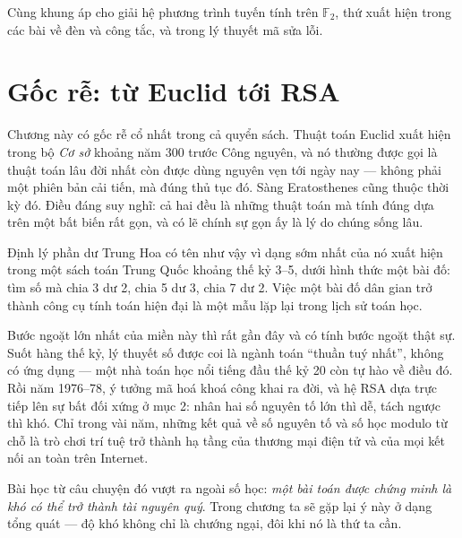 \documentclass[../../algorithm.tex]{subfiles}
\begin{document}
Cùng khung áp cho giải hệ phương trình tuyến tính trên \(\mathbb{F}_2\), thứ xuất hiện trong các bài về đèn và công tắc, và trong lý thuyết mã sửa lỗi.

\section{Gốc rễ: từ Euclid tới RSA}

Chương này có gốc rễ cổ nhất trong cả quyển sách. Thuật toán Euclid xuất hiện trong bộ \emph{Cơ sở} khoảng năm 300 trước Công nguyên, và nó thường được gọi là thuật toán lâu đời nhất còn được dùng nguyên vẹn tới ngày nay --- không phải một phiên bản cải tiến, mà đúng thủ tục đó. Sàng Eratosthenes cũng thuộc thời kỳ đó. Điều đáng suy nghĩ: cả hai đều là những thuật toán mà tính đúng dựa trên một bất biến rất gọn, và có lẽ chính sự gọn ấy là lý do chúng sống lâu.

Định lý phần dư Trung Hoa có tên như vậy vì dạng sớm nhất của nó xuất hiện trong một sách toán Trung Quốc khoảng thế kỷ 3--5, dưới hình thức một bài đố: tìm số mà chia 3 dư 2, chia 5 dư 3, chia 7 dư 2. Việc một bài đố dân gian trở thành công cụ tính toán hiện đại là một mẫu lặp lại trong lịch sử toán học.

Bước ngoặt lớn nhất của miền này thì rất gần đây và có tính bước ngoặt thật sự. Suốt hàng thế kỷ, lý thuyết số được coi là ngành toán ``thuần tuý nhất'', không có ứng dụng --- một nhà toán học nổi tiếng đầu thế kỷ 20 còn tự hào về điều đó. Rồi năm 1976--78, ý tưởng mã hoá khoá công khai ra đời, và hệ RSA dựa trực tiếp lên sự bất đối xứng ở mục 2: nhân hai số nguyên tố lớn thì dễ, tách ngược thì khó. Chỉ trong vài năm, những kết quả về số nguyên tố và số học modulo từ chỗ là trò chơi trí tuệ trở thành hạ tầng của thương mại điện tử và của mọi kết nối an toàn trên Internet.

Bài học từ câu chuyện đó vượt ra ngoài số học: \emph{một bài toán được chứng minh là khó có thể trở thành tài nguyên quý}. Trong chương  ta sẽ gặp lại ý này ở dạng tổng quát --- độ khó không chỉ là chướng ngại, đôi khi nó là thứ ta cần.
\end{document}
